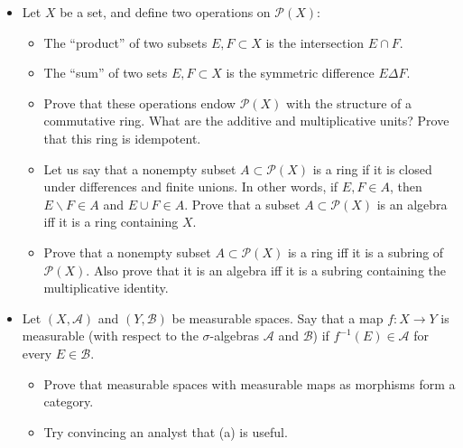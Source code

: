 \documentclass{qlnotes-export}
\begin{document}
\begin{itemize}
\item
  Let \(X\) be a set, and define two operations on \(\mathcal{P}(X)\):

  \begin{itemize}
  \item
    The ``product'' of two subsets \(E,F \subset X\) is the intersection \(E \cap F\).
  \item
    The ``sum'' of two sets \(E,F \subset X\) is the symmetric difference \(E\Delta F\).
  \item
    Prove that these operations endow \(\mathcal{P}(X)\) with the structure of a commutative ring. What are the additive and multiplicative units? Prove that this ring is idempotent.
  \item
    Let us say that a nonempty subset \(A \subset \mathcal{P}(X)\) is a ring if it is closed under differences and finite unions. In other words, if \(E,F \in A\), then \(E\backslash F \in A\) and \(E \cup F \in A\). Prove that a subset \(A \subset \mathcal{P}(X)\) is an algebra iff it is a ring containing \(X\).
  \item
    Prove that a nonempty subset \(A \subset \mathcal{P}(X)\) is a ring iff it is a subring of \(\mathcal{P}(X)\). Also prove that it is an algebra iff it is a subring containing the multiplicative identity.
  \end{itemize}
\item
  Let \((X,\mathcal{A})\) and \((Y,\mathcal{B})\) be measurable spaces. Say that a map \(f:X\rightarrow Y\) is measurable (with respect to the \(\sigma\)-algebras \(\mathcal{A}\) and \(\mathcal{B}\)) if \(f^{- 1}(E) \in \mathcal{A}\) for every \(E \in \mathcal{B}\).

  \begin{itemize}
  \item
    Prove that measurable spaces with measurable maps as morphisms form a category.
  \item
    Try convincing an analyst that (a) is useful.
  \end{itemize}
\end{itemize}
\end{document}
